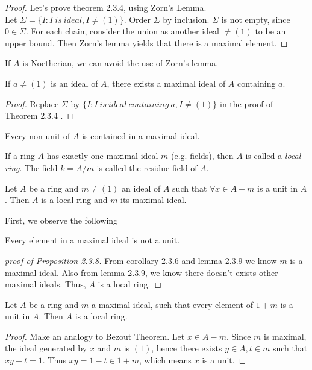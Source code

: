 \documentclass[11pt,fleqn]{book} %
\begin{document}
\begin{CJK}{UTF8}{gkai}
\begin{proof}
	Let's prove theorem 2.3.4, using Zorn's Lemma. \\
	Let $\Sigma = \{I : I \ is \ ideal, I \neq (1)\}$. Order $\Sigma$ by inclusion. $\Sigma$ is not empty, since $0 \in \Sigma$. For each chain, consider the union as another ideal $\neq (1)$ to be an upper bound. Then Zorn's lemma yields that there is a maximal element.
\end{proof}
\begin{remark}
	If $A$ is Noetherian, we can avoid the use of Zorn's lemma.	
\end{remark}

\begin{corollary}
	If $a \neq (1)$ is an ideal of $A$, there exists a maximal ideal of $A$ containing $a$.
\end{corollary}
\begin{proof}
	Replace $\Sigma$ by $\{I: I \ is \ ideal \ containing \ a, I \neq (1)\}$ in the proof of Theorem 2.3.4 .
\end{proof}

\begin{corollary}
	Every non-unit of $A$ is contained in a maximal ideal.
\end{corollary}

\begin{definition}
	 If a ring $A$ has exactly one maximal ideal $m$ (e.g. fields), then $A$ is called a {\it local ring}. The field $k = A/m$ is called the residue field of $A$.
\end{definition}

\begin{proposition}
	Let $A$ be a ring and $m \neq (1)$ an ideal of $A$ such that $\forall x \in A - m$ is a unit in $A$. Then $A$ is a local ring and $m$ its maximal ideal.
\end{proposition}

First, we observe the following
\begin{lemma}
	Every element in a maximal ideal is not a unit.
\end{lemma}

\begin{proof}[proof of Proposition 2.3.8]
	From corollary 2.3.6 and lemma 2.3.9 we know $m$ is a maximal ideal. Also from lemma 2.3.9, we know there doesn't exists other maximal ideals. Thus, $A$ is a local ring.
\end{proof}

\begin{proposition}
	Let $A$ be a ring and $m$ a maximal ideal, such that every element of $1 + m$ is a unit in $A$. Then $A$ is a local ring.
\end{proposition}
\begin{proof}
	Make an analogy to Bezout Theorem. Let $x \in A - m$. Since $m$ is maximal, the ideal generated by $x$ and $m$ is $(1)$, hence there exists $y \in A, t\in m$ such that $xy + t = 1$.
	Thus $xy = 1 - t \in 1 + m$, which means $x$ is a unit. 
\end{proof}


\end{CJK}
\end{document}
